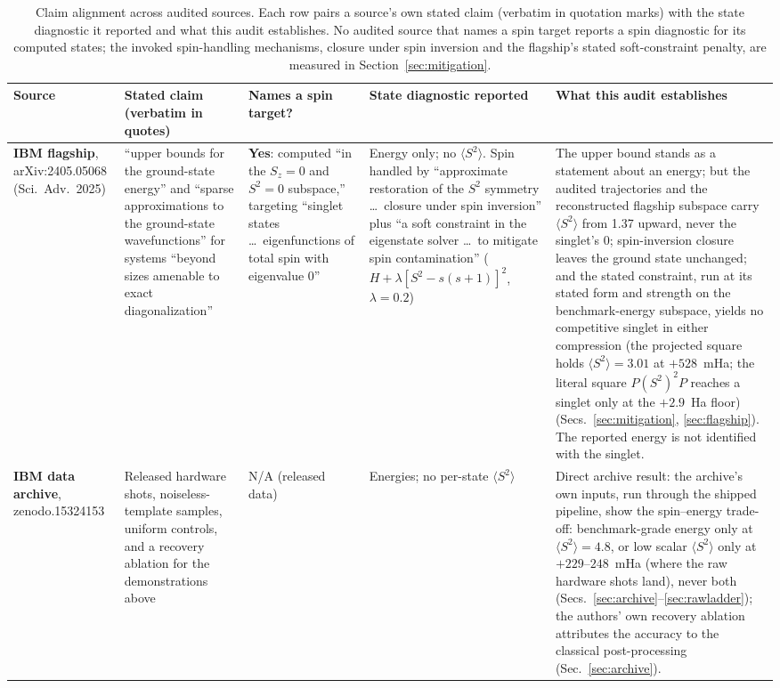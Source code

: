\documentclass[11pt]{article}
\newcommand{\ssq}{\ensuremath{\langle S^2\rangle}}
\begin{document}
\begin{table}[!ht]\centering\small
\setlength{\tabcolsep}{4pt}
\renewcommand{\arraystretch}{1.15}
\caption{Claim alignment across audited sources. Each row pairs a source's own stated claim (verbatim in quotation marks) with the state diagnostic it reported and what this audit establishes. No audited source that names a spin target reports a spin diagnostic for its computed states; the invoked spin-handling mechanisms, closure under spin inversion and the flagship's stated soft-constraint penalty, are measured in Section~\ref{sec:mitigation}.}
\label{tab:claims}
\begin{tabular}{p{2.6cm}p{3.4cm}p{2.1cm}p{2.4cm}p{3.5cm}}
\toprule
\textbf{Source} & \textbf{Stated claim (verbatim in quotes)} & \textbf{Names a spin target?} & \textbf{State diagnostic reported} & \textbf{What this audit establishes} \\
\midrule
\textbf{IBM flagship}, arXiv:2405.05068 (Sci.\ Adv.\ 2025) & ``upper bounds for the ground-state energy'' and ``sparse approximations to the ground-state wavefunctions'' for systems ``beyond sizes amenable to exact diagonalization'' & \textbf{Yes}: computed ``in the $S_z=0$ and $S^2=0$ subspace,'' targeting ``singlet states \ldots\ eigenfunctions of total spin with eigenvalue 0'' & Energy only; no \ssq{}. Spin handled by ``approximate restoration of the $S^2$ symmetry \ldots\ closure under spin inversion'' plus ``a soft constraint in the eigenstate solver \ldots\ to mitigate spin contamination'' ($H+\lambda[S^2-s(s+1)]^2$, $\lambda=0.2$) & The upper bound stands as a statement about an energy; but the audited trajectories and the reconstructed flagship subspace carry \ssq{} from 1.37 upward, never the singlet's 0; spin-inversion closure leaves the ground state unchanged; and the stated constraint, run at its stated form and strength on the benchmark-energy subspace, yields no competitive singlet in either compression (the projected square holds $\ssq = 3.01$ at $+528$~mHa; the literal square $P(S^2)^2P$ reaches a singlet only at the $+2.9$~Ha floor) (Secs.~\ref{sec:mitigation}, \ref{sec:flagship}). The reported energy is not identified with the singlet. \\
\midrule
\textbf{IBM data archive}, zenodo.15324153 & Released hardware shots, noiseless-template samples, uniform controls, and a recovery ablation for the demonstrations above & N/A (released data) & Energies; no per-state \ssq{} & Direct archive result: the archive's own inputs, run through the shipped pipeline, show the spin--energy trade-off: benchmark-grade energy only at $\ssq=4.8$, or low scalar \ssq{} only at $+229$--$248$~mHa (where the raw hardware shots land), never both (Secs.~\ref{sec:archive}--\ref{sec:rawladder}); the authors' own recovery ablation attributes the accuracy to the classical post-processing (Sec.~\ref{sec:archive}). \\

\end{tabular}
\end{table}
\end{document}
